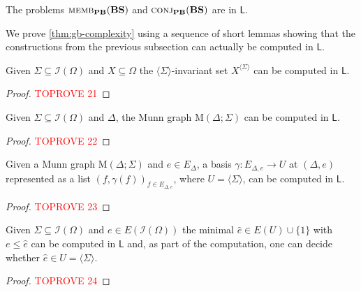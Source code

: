 \documentclass[anonymous,letter,UKenglish,cleveref,autoref,thm-restate]{lipics-v2021}
\renewcommand{\leq}{\leqslant}
\newcommand{\sse}{\subseteq}
\newcommand{\gen}[1]{\langle #1 \rangle}
\newcommand{\LOGSPACE}{\ensuremath{\mathsf{L}}\xspace}
\newcommand{\vBS}{\ensuremath{\mathbf{BS}}}  \newcommand{\vBM}{\ensuremath{\mathbf{BM}}}
\newcommand{\ISym}{\cI}
\newcommand{\cI}{\mathcal{I}}
\theoremstyle{plain}
\theoremstyle{plain}
\newcommand{\dMemb}[2][]{\textup{\textsc{memb${}_{\mathbf{#1}}\expandafter\ifx\expandafter\relax\detokenize{#2}\relax\else(#2)\fi$}}}
\newcommand{\dConj}[2][]{\textup{\textsc{conj${}_{\mathbf{#1}}\expandafter\ifx\expandafter\relax\detokenize{#2}\relax\else(#2)\fi$}}}
\begin{document}
\begin{corollary}\label{cor:mem-BS}
The problems $\dMemb[PB]{\vBS}$ and $\dConj[PB]{\vBS}$ are in \LOGSPACE.
\end{corollary}

We prove \cref{thm:gb-complexity} using a sequence of short lemmas showing that the constructions from the previous subsection can actually be computed in \LOGSPACE.

\begin{lemma}\label{lem:gb-delta-sl}
	Given $\Sigma \sse \ISym(\Omega)$ and $X \sse\Omega$ the $\gen{\Sigma}$-invariant set $X^{\gen{\Sigma}}$ can be computed in \LOGSPACE.
\end{lemma}
\begin{proof}\textcolor{red}{TOPROVE 21}\end{proof}


\begin{lemma}\label{lem:gb-mann-sl}
	Given $\Sigma \sse \ISym(\Omega)$ and $\Delta$, the Munn graph $\mathrm{M}(\Delta; \Sigma)$ can be computed in \LOGSPACE.
\end{lemma}


\begin{proof}\textcolor{red}{TOPROVE 22}\end{proof}



\begin{lemma}\label{lem:gb-basis-sl}
	Given a Munn graph $\mathrm{M}(\Delta; \Sigma)$ and $e \in E_\Delta$, a basis $\gamma \colon E_{\Delta, e} \to U$ at $(\Delta, e)$ represented as a list $(f,\gamma(f))_{f \in E_{\Delta, e}}$, where $U = \gen\Sigma$, can be computed in \LOGSPACE.
\end{lemma}

\begin{proof}\textcolor{red}{TOPROVE 23}\end{proof}




\begin{lemma}\label{lem:gb-hat-e-sl}
  Given $\Sigma \sse \ISym(\Omega)$ and $e \in E(\ISym(\Omega))$ the minimal $\hat e \in E(U) \cup \{1\}$ with $e \leq \hat e$ can be computed in \LOGSPACE{} and, as part of the computation, one can decide whether $\hat e \in U = \gen\Sigma$.
\end{lemma}

\begin{proof}\textcolor{red}{TOPROVE 24}\end{proof}
\end{document}
